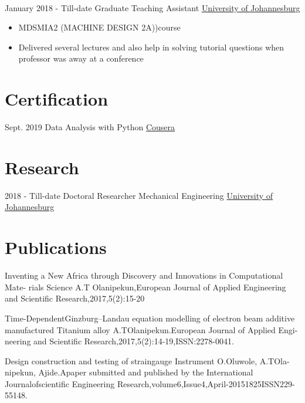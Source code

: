 \documentclass[letterpaper]{twentysecondcv} %
\begin{document}
\begin{twenty}
{{\begin{itemize}
        

    \end{itemize}}
        }
    \\   
    \twentyitem
   		{January 2018 -}
		{Till-date}
        {Graduate Teaching Assistant}
        {\href{http://www.uj.ac.za}{University of Johannesburg}}
        {}
        {
        {\begin{itemize}
        \item MDSMIA2 (MACHINE DESIGN 2A))course

        \item Delivered several lectures and also help in solving tutorial questions when professor was away at a conference
    \end{itemize}}
        }
     
        
\end{twenty}
\section{Certification}
\begin{twenty} 
\twentyitem
    	{Sept. 2019}
		{}
        {Data Analysis with Python}
        {\href{https://www.coursera.org/account/accomplishments/verify/KCA2L5Y27SNY/}{Cousera}}
        {}
        {
       	
       
        }

\end{twenty}
\section{Research}
\begin{twenty}
	\twentyitem
    	{2018 - Till-date}
		{}
        {Doctoral Researcher Mechanical Engineering}
        {\href{http://www.uj.ac.za/}{University of Johannesburg}}
        {}
        {
       	
       
        }
\end{twenty}

\section{Publications}
Inventing a New Africa through Discovery and Innovations in Computational Mate-
rials Science A.T Olanipekun,European Journal of Applied Engineering and Scientific
Research,2017,5(2):15-20

Time-DependentGinzburg–Landau equation modelling of electron beam additive
manufactured Titanium alloy A.TOlanipekun.European Journal of Applied Engi-
neering and Scientific Research,2017,5(2):14-19,ISSN:2278-0041.

Design construction and testing of straingauge Instrument O.Oluwole, A.TOla-
nipekun, Ajide.Apaper submitted and published by the International Journalofscientific Engineering Research,volume6,Issue4,April-20151825ISSN229-55148.
\end{document}
